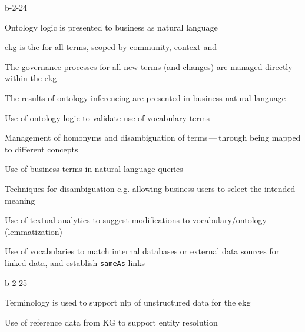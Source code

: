 \begin{level-assessment}{b-2-2}{4}

  \item Ontology logic is presented to business as natural language
  \item \Gls{ekg} is the  for all terms, scoped by community, context and 
  \item The governance processes for all new terms (and changes) are managed directly within the \gls{ekg}
  \item The results of ontology inferencing are presented in business natural language
  \item Use of ontology logic to validate use of vocabulary terms
  \item Management of homonyms and disambiguation of terms\,---\,through being mapped to different concepts
  \item Use of business terms in natural language queries
  \item Techniques for disambiguation e.g. allowing business users to select the intended meaning
  \item Use of textual analytics to suggest modifications to vocabulary/ontology (lemmatization)
  \item Use of vocabularies to match internal databases or external data sources for linked data,
        and establish \lstinline|sameAs| links

\end{level-assessment}

\begin{level-assessment}{b-2-2}{5}

  \item Terminology is used to support \gls{nlp} of unstructured data for the \gls{ekg}
  \item Use of reference data from KG to support entity resolution

\end{level-assessment}

